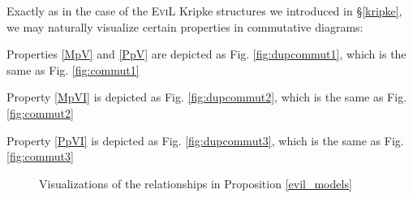 Exactly as in the case of the \textsc{EviL} Kripke structures we
introduced in \S\ref{kripke}, we may naturally visualize certain
properties in commutative diagrams:
\begin{bul}
\item  Properties \ref{MpV} and \ref{PpV} are depicted as
Fig. \ref{fig:dupcommut1}, which is the same as Fig. \ref{fig:commut1}
\item  Property \ref{MpVI} is depicted as
Fig. \ref{fig:dupcommut2}, which is the same as Fig. \ref{fig:commut2}
\item  Property \ref{PpVI} is depicted as
Fig. \ref{fig:dupcommut3}, which is the same as Fig. \ref{fig:commut3}
\end{bul}

\begin{figure}[ht]
\centering
\hspace{1cm}
\caption{Visualizations of the relationships in Proposition \ref{evil_models}}
\end{figure}

